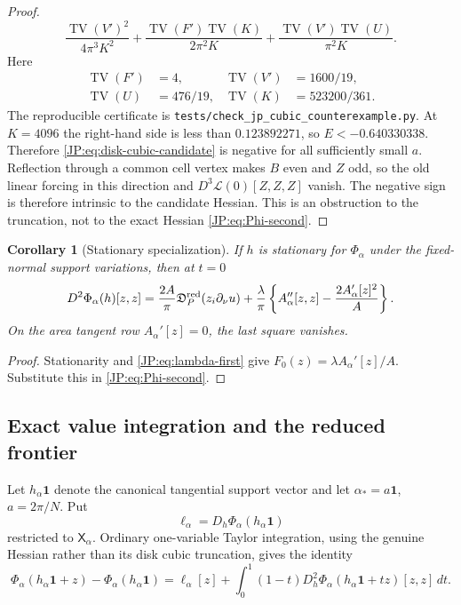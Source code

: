 \documentclass[11pt]{amsart}
\numberwithin{equation}{section}
\newtheorem{corollary}[theorem]{Corollary}
\theoremstyle{definition}
\theoremstyle{remark}
\newcommand{\Dred}{\mathfrak D^{\rm red}}
\begin{document}
\begin{proof}
\[ \frac{\operatorname{TV}(V')^2}{4\pi^3K^2}
 +\frac{\operatorname{TV}(F')\operatorname{TV}(K)}{2\pi^2K}
 +\frac{\operatorname{TV}(V')\operatorname{TV}(U)}{\pi^2K}.
\]
Here
\begin{align*}
 \operatorname{TV}(F')&=4,&
 \operatorname{TV}(V')&=1600/19,\\
 \operatorname{TV}(U)&=476/19,&
 \operatorname{TV}(K)&=523200/361.
\end{align*}
The reproducible certificate is
\nolinkurl{tests/check_jp_cubic_counterexample.py}.  At $K=4096$ the
right-hand side is less than $0.123892271$, so
$E<-0.640330338$.  Therefore \eqref{JP:eq:disk-cubic-candidate} is negative
for all sufficiently small $a$.  Reflection through a common cell vertex
makes $B$ even and $Z$ odd, so the old linear forcing in this direction and
$D^3\mathcal L(0)[Z,Z,Z]$ vanish.  The negative sign is therefore intrinsic
to the candidate Hessian.  This is an obstruction to the truncation, not
to the exact Hessian \eqref{JP:eq:Phi-second}.
\end{proof}

\begin{corollary}[Stationary specialization]
\label{JP:cor:stationary}
If $h$ is stationary for $\Phi_\alpha$ under the fixed-normal support
variations, then at $t=0$
\begin{equation}\label{JP:eq:stationary-specialization}
 D^2\Phi_\alpha(h)[z,z]
 =\frac{2A}{\pi}\Dred_P(z_i\partial_\nu u)
 +\frac\lambda\pi\left\{A_\alpha''[z,z]
       -\frac{2A_\alpha'[z]^2}{A}\right\}.
\end{equation}
On the area tangent row $A_\alpha'[z]=0$, the last square vanishes.
\end{corollary}

\begin{proof}
Stationarity and \eqref{JP:eq:lambda-first} give
$F_0(z)=\lambda A_\alpha'[z]/A$.  Substitute this in
\eqref{JP:eq:Phi-second}.
\end{proof}

\subsection{Exact value integration and the reduced frontier}

Let $h_\alpha\mathbf1$ denote the canonical tangential support vector and
let $\alpha_*=a\mathbf1$, $a=2\pi/N$.  Put
\begin{equation}\label{JP:eq:forcing}
 \ell_\alpha=D_h\Phi_\alpha(h_\alpha\mathbf1)
\end{equation}
restricted to $\mathsf X_\alpha$.  Ordinary one-variable Taylor
integration, using the genuine Hessian rather than its disk cubic
truncation, gives the identity
\begin{equation}\label{JP:eq:exact-integration}
 \boxed{
 \Phi_\alpha(h_\alpha\mathbf1+z)-\Phi_\alpha(h_\alpha\mathbf1)
 =\ell_\alpha[z]
 +\int_0^1(1-t)
 D_h^2\Phi_\alpha(h_\alpha\mathbf1+tz)[z,z]\,dt.}
\end{equation}
\end{document}
